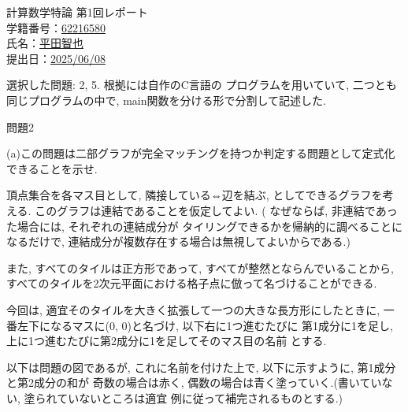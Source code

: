 \documentclass[a4paper]{ltjsarticle}
\begin{document}
\begin{center}
{\LARGE 計算数学特論 第1回レポート}\\[1em]
学籍番号：\underline{62216580}\\
氏名：\underline{平田智也}\\
提出日：\underline{2025/06/08}
\end{center}

選択した問題: 2, 5. 根拠には自作のC言語の
プログラムを用いていて, 二つとも同じプログラムの中で,
main関数を分ける形で分割して記述した.

問題2

(a)この問題は二部グラフが完全マッチングを持つか判定する問題として定式化できることを示せ.

頂点集合を各マス目として, 隣接している⇔辺を結ぶ, としてできるグラフを考える.
このグラフは連結であることを仮定してよい. ( なぜならば, 非連結であった場合には, それぞれの連結成分が
タイリングできるかを帰納的に調べることになるだけで, 連結成分が複数存在する場合は無視してよいからである.)

また, すべてのタイルは正方形であって, すべてが整然とならんでいることから,
すべてのタイルを2次元平面における格子点に倣って名づけることができる.

今回は, 適宜そのタイルを大きく拡張して一つの大きな長方形にしたときに,
一番左下になるマスに(0, 0)と名づけ, 以下右に1つ進むたびに
第1成分に1を足し, 上に1つ進むたびに第2成分に1を足してそのマス目の名前
とする.

\begin{center}
\end{center}

以下は問題の図であるが, これに名前を付けた上で, 以下に示すように, 第1成分と第2成分の和が
奇数の場合は赤く, 偶数の場合は青く塗っていく.(書いていない, 塗られていないところは適宜
例に従って補完されるものとする.)
\end{document}
